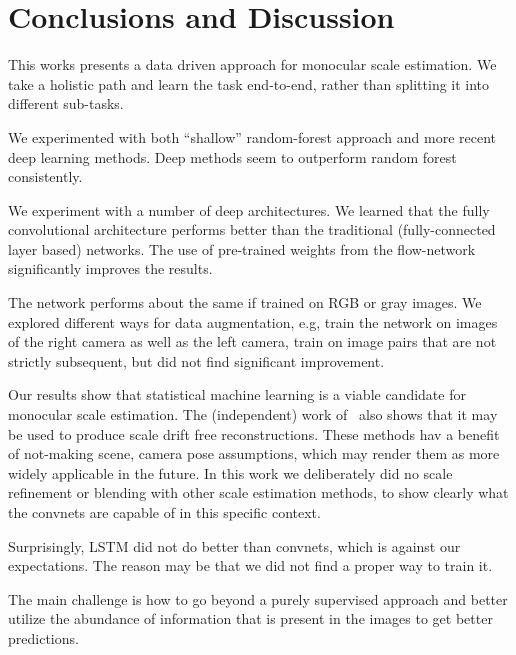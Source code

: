\section{Conclusions and Discussion}

This works presents a data driven approach for monocular scale
estimation.  We take a holistic path and learn the task end-to-end,
rather than splitting it into different sub-tasks.

We experimented with both ``shallow'' random-forest approach and more
recent deep learning methods.  Deep methods seem to outperform random
forest consistently.

We experiment with a number of deep architectures. We learned that the
fully convolutional architecture performs better than the traditional
(fully-connected layer based) networks.  The use of pre-trained weights
from the flow-network significantly improves the results.

The network performs about the same if trained on RGB or gray images.
We explored different ways for data augmentation, e.g, train the
network on images of the right camera as well as the left camera,
train on image pairs that are not strictly subsequent, but did not
find significant improvement.

Our results show that statistical machine learning is a viable
candidate for monocular scale estimation.  The (independent) work
of~\cite{frost2017using} also shows that it may be used to produce scale
drift free reconstructions.  These methods hav a benefit of not-making
scene, camera pose assumptions, which may render them as more widely
applicable in the future.  In this work we deliberately did no scale
refinement or blending with other scale estimation methods, to show
clearly what the convnets are capable of in this specific context.

Surprisingly, LSTM did not do better than convnets, which is against
our expectations. The reason may be that we did not find a proper way
to train it.

The main challenge is how to go beyond a purely supervised approach
and better utilize the abundance of information that is present in the
images to get better predictions.

